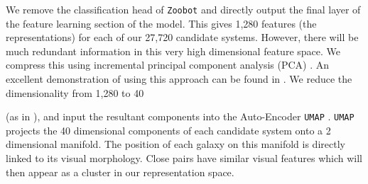 We remove the classification head of \texttt{Zoobot} and directly output the final layer of the feature learning section of the model. This gives 1,280 features (the representations) for each of our 27,720 candidate systems. However, there will be much redundant information in this very high dimensional feature space. We compress this using incremental principal component analysis (PCA) \citep{ross08}. An excellent demonstration of using this approach can be found in \citet{2022MNRAS.513.1581W}. We reduce the dimensionality from 1,280 to 40 {(as in \citet{2022MNRAS.513.1581W}), and input the resultant components into the Auto-Encoder \texttt{UMAP} \citep{umap}. \texttt{UMAP} projects the 40 dimensional components of each candidate system onto a 2 dimensional manifold. The position of each galaxy on this manifold is directly linked to its visual morphology. Close pairs have similar visual features which will then appear as a cluster in our representation space.

}
